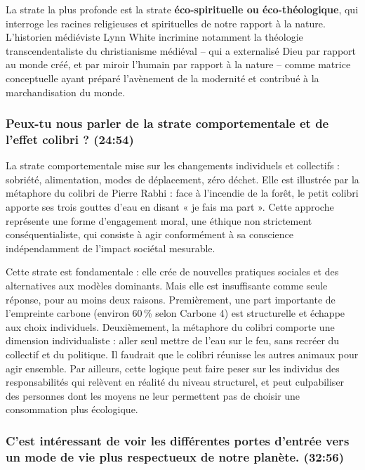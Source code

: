 La strate la plus profonde est la strate \textbf{éco-spirituelle ou éco-théologique}, qui interroge les racines religieuses et spirituelles de notre rapport à la nature. L'historien médiéviste Lynn White incrimine notamment la théologie transcendentaliste du christianisme médiéval -- qui a externalisé Dieu par rapport au monde créé, et par miroir l'humain par rapport à la nature -- comme matrice conceptuelle ayant préparé l'avènement de la modernité et contribué à la marchandisation du monde.

\subsubsection{Peux-tu nous parler de la strate comportementale et de l'effet colibri ? \textnormal{\small(24:54)}}

La strate comportementale mise sur les changements individuels et collectifs : sobriété, alimentation, modes de déplacement, zéro déchet. Elle est illustrée par la métaphore du colibri de Pierre Rabhi : face à l'incendie de la forêt, le petit colibri apporte ses trois gouttes d'eau en disant « je fais ma part ». Cette approche représente une forme d'engagement moral, une éthique non strictement conséquentialiste, qui consiste à agir conformément à sa conscience indépendamment de l'impact sociétal mesurable.

Cette strate est fondamentale : elle crée de nouvelles pratiques sociales et des alternatives aux modèles dominants. Mais elle est insuffisante comme seule réponse, pour au moins deux raisons. Premièrement, une part importante de l'empreinte carbone (environ 60\,\% selon Carbone 4) est structurelle et échappe aux choix individuels. Deuxièmement, la métaphore du colibri comporte une dimension individualiste : aller seul mettre de l'eau sur le feu, sans recréer du collectif et du politique. Il faudrait que le colibri réunisse les autres animaux pour agir ensemble. Par ailleurs, cette logique peut faire peser sur les individus des responsabilités qui relèvent en réalité du niveau structurel, et peut culpabiliser des personnes dont les moyens ne leur permettent pas de choisir une consommation plus écologique.

\subsubsection{C'est intéressant de voir les différentes portes d'entrée vers un mode de vie plus respectueux de notre planète. \textnormal{\small(32:56)}}

